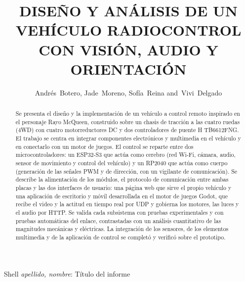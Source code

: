 \documentclass[journal]{IEEEtran}
\begin{document}
\title{DISEÑO Y ANÁLISIS DE UN VEHÍCULO RADIOCONTROL CON VISIÓN, AUDIO Y ORIENTACIÓN}
\author{Andrés~Botero, Jade~Moreno, Sofía~Reina and~Vivi~Delgado}%


%
{Shell \MakeLowercase{\textit{Apellido, Nombre}}: Título del informe}

\maketitle

\begin{abstract}
Se presenta el diseño y la implementación de un vehículo a control remoto inspirado en el personaje Rayo McQueen, construido sobre un chasis de tracción a las cuatro ruedas (4WD) con cuatro motorreductores DC y dos controladores de puente H TB6612FNG. El trabajo se centra en integrar componentes electrónicos y multimedia en el vehículo y en conectarlo con un motor de juegos. El control se reparte entre dos microcontroladores: un ESP32-S3 que actúa como cerebro (red Wi-Fi, cámara, audio, sensor de movimiento y control del vehículo) y un RP2040 que actúa como cuerpo (generación de las señales PWM y de dirección, con un vigilante de comunicación). Se describe la alimentación de los módulos, el protocolo de comunicación entre ambas placas y las dos interfaces de usuario: una página web que sirve el propio vehículo y una aplicación de escritorio y móvil desarrollada en el motor de juegos Godot, que recibe el video y la actitud en tiempo real por UDP y gobierna los motores, las luces y el audio por HTTP. Se valida cada subsistema con pruebas experimentales y con pruebas automáticas del enlace, contrastadas con un análisis cuantitativo de las magnitudes mecánicas y eléctricas. La integración de los sensores, de los elementos multimedia y de la aplicación de control se completó y verificó sobre el prototipo.
\end{abstract}
\end{document}
